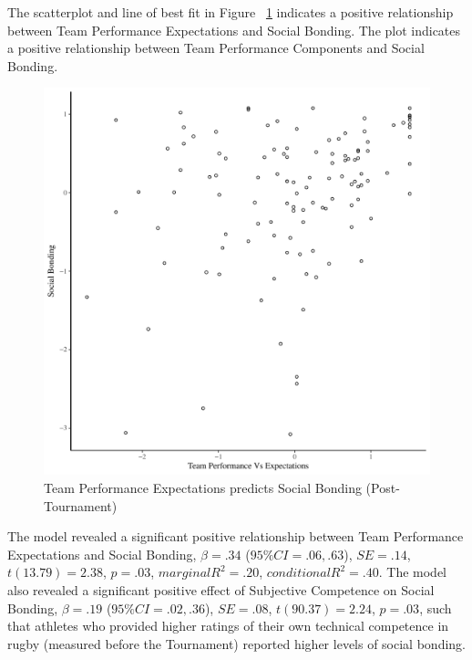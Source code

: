 \begin{CJK}{UTF8}{gbsn}
The scatterplot and line of best fit in Figure ~\ref{fig:teamPerfBondBasicXY} indicates a positive relationship between Team Performance Expectations and Social Bonding. The plot indicates a positive relationship between Team Performance Components and Social Bonding.

  \begin{figure}[htbp]
    \centering
  \includegraphics[scale=.5]{images/teamPerfBondBasicXY.pdf}
    \caption{Team Performance Expectations predicts Social Bonding (Post-Tournament)}
    \label{fig:teamPerfBondBasicXY}
  \end{figure}

The model revealed a significant positive relationship between Team Performance Expectations and Social Bonding, $\beta = .34$ ($95\% CI =  .06, .63$), $SE = .14$, $t(13.79) = 2.38$, $p = .03$, $marginal R^2 = .20$, $conditional R^2 = .40$.  The model also revealed a significant positive effect of Subjective Competence on Social Bonding, $\beta = .19$ ($95\% CI =  .02, .36$), $SE = .08$, $t(90.37) = 2.24$, $p = .03$, such that athletes who provided higher ratings of their own technical competence in rugby (measured before the Tournament) reported higher levels of social bonding.


\end{CJK}
